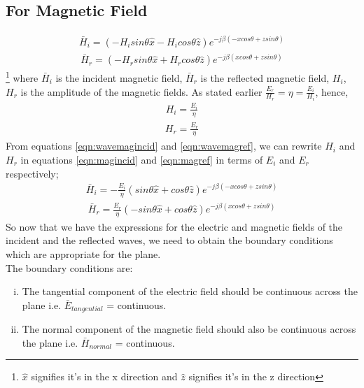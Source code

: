 \subsection{For Magnetic Field}
\begin{align}
\bar{H}_i = (-H_i sin\theta \hat{x} - H_i cos\theta \hat{z}) e ^{-j\beta( -xcos\theta + zsin\theta)}
\label{eqn:magincid}
\end{align}
\begin{align}
\bar{H}_r = (-H_r sin\theta \hat{x} + H_r cos\theta \hat{z}) e ^{-j\beta( xcos\theta + zsin\theta)}
\label{eqn:magref}
\end{align}\footnote{$\hat{x}$ signifies it's in the x direction and $\hat{z}$ signifies it's in the z direction}
where $\bar{H}_i$ is the incident magnetic field, $\bar{H}_r$ is the reflected magnetic field, $H_i$, $H_r$ is the amplitude of the magnetic fields. As stated earlier $\frac{E_r}{H_r} = \eta = \frac{E_i}{H_i}$, hence, 
\begin{align}
H_i = \frac{E_i}{\eta}
\label{eqn:wavemagincid}
\end{align}
\begin{align}
H_r = \frac{E_r}{\eta}
\label{eqn:wavemagref}
\end{align}
From equations \ref{eqn:wavemagincid} and \ref{eqn:wavemagref}, we can rewrite $H_i$ and $H_r$ in equations \ref{eqn:magincid} and \ref{eqn:magref} in terms of $E_i$ and $E_r$ respectively;
\begin{align}
\bar{H}_i = - \frac{E_i}{\eta} (sin\theta \hat{x} + cos\theta \hat{z})e^{-j\beta (-xcos\theta + zsin\theta)}
\end{align}
\begin{align}
\bar{H}_r =  \frac{E_r}{\eta} (-sin\theta \hat{x} + cos\theta \hat{z})e^{-j\beta (xcos\theta + zsin\theta)}
\end{align}
So now that we have the expressions for the electric and magnetic fields of the incident and the reflected waves, we need to obtain the boundary conditions which are appropriate for the plane.\\ 
The boundary conditions are:
\begin{enumerate}[(i)]
\item The tangential component of the electric field should be continuous across the plane i.e. $\bar{E}_{tangential}$ = continuous.
\item The normal component of the magnetic field should also be continuous across the plane i.e. $\bar{H}_{normal}$ = continuous.
\end{enumerate} 
